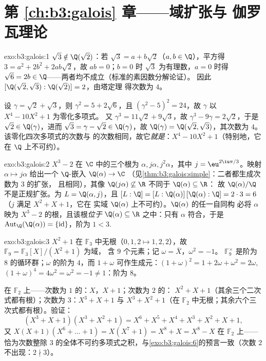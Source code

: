 \section*{第 \ref{ch:b3:galois} 章——域扩张与
伽罗瓦理论}

\begin{solution}{exo:b3:galois:1}
$\sqrt3 \notin \Q(\sqrt2)$：若 $\sqrt3 = a + b\sqrt2$（$a, b
\in \Q$），平方得 $3 = a^2 + 2b^2 + 2ab\sqrt2$，故 $ab =
0$；$b = 0$ 时 $\sqrt3$ 为有理数，$a = 0$ 时得 $\sqrt6 = 2b
\in \Q$——两者均不成立（标准的素因数分解论证）。
因此 $[\Q(\sqrt2,\sqrt3) : \Q(\sqrt2)] = 2$，由塔定理
得次数为 $4$。

设 $\gamma = \sqrt2 + \sqrt3$，则 $\gamma^2 = 5 + 2\sqrt6$，且
$(\gamma^2 - 5)^2 = 24$，故 $\gamma$ 以 $X^4 - 10X^2 + 1$ 为零化多项式。
又 $\gamma^3 = 11\sqrt2 + 9\sqrt3$，故 $\gamma^3 - 9\gamma
= 2\sqrt2$，于是 $\sqrt2 \in \Q(\gamma)$，进而 $\sqrt3 = \gamma -
\sqrt2 \in \Q(\gamma)$，故 $\Q(\gamma) = \Q(\sqrt2,\sqrt3)$，其次数为
$4$。该零化四次多项式的次数与
的次数相同，故它\emph{就是}：$X^4 -
10X^2 + 1$（特别地，它在 $\Q$ 上不可约）。
\end{solution}

\begin{solution}{exo:b3:galois:2}
$X^3 - 2$ 在 $\C$ 中的三个根为 $\alpha, j\alpha,
j^2\alpha$，其中 $j = \eu^{2\iu\pi/3}$。映射 $\alpha \mapsto
j\alpha$ 给出一个 $\Q$-嵌入 $\Q(\alpha) \to \C$
（见\cref{thm:b3:galois:simple}：二者都生成次数为 $3$ 的扩张，
且相同），其像 $\Q(j\alpha)
\not\subseteq \R$ 不同于 $\Q(\alpha) \subseteq \R$：
故 $\Q(\alpha)/\Q$ 不是正规扩张。为 $L =
\Q(\alpha, j)$，且 $[L:\Q] = [L:\Q(\alpha)]\,[\Q(\alpha):\Q] =
2 \cdot 3 = 6$（$j$ 满足 $X^2 + X + 1$，它在
实域 $\Q(\alpha)$ 上不可约）。$\Q(\alpha)$ 的任一自同构
必将 $\alpha$ 映为 $X^3 - 2$ 的根，且该根\emph{位于}
$\Q(\alpha) \subseteq \R$ 之中：只有 $\alpha$ 符合，于是
$\operatorname{Aut}_\Q(\Q(\alpha)) = \{\mathrm{id}\}$，阶为
$1 < 3$.
\end{solution}

\begin{solution}{exo:b3:galois:3}
$X^2 + 1$ 在 $\mathbb F_3$ 中无根（$0, 1, 2 \mapsto 1, 2,
2$），故 $\mathbb F_9 = \mathbb F_3[X]/(X^2+1)$ 为域，
含 $9$ 个元素；记 $\omega = \bar X$，$\omega^2 = -1$。
$\mathbb F_9^\times$ 是阶为 $8$ 的循环群；$\omega$ 的阶为
$4$，而 $1 + \omega$ 可作生成元：$(1+\omega)^2 = 1 + 2\omega +
\omega^2 = 2\omega$, $(1+\omega)^4 = 4\omega^2 = \omega^2 = -1
\ne 1$：阶为 $8$。

在 $\mathbb F_2$ 上——次数为 $1$ 的：$X$，$X + 1$；次数为 $2$ 的：
$X^2 + X + 1$（其余三个二次式都有根）；次数为
$3$：$X^3 + X + 1$ 与 $X^3 + X^2 + 1$（在 $\mathbb
F_2$ 中无根；其余六个三次式都有根）。验证：
\[
(X^3{+}X{+}1)(X^3{+}X^2{+}1) = X^6 + X^5 + X^4 + X^3 + X^2 + X
+ 1,
\]
又 $X(X{+}1)(X^6 + \dots + 1) = X(X^7 + 1) = X^8 + X = X^8 -
X$ 在 $\mathbb F_2$ 上——恰为次数整除
$3$ 的全体不可约多项式之积，与\cref{exo:b3:galois:6}的预言一致（次数 $2$
不出现：$2 \nmid 3$）。
\end{solution}


